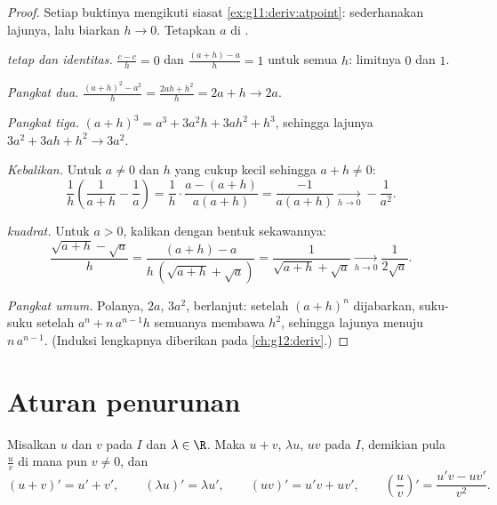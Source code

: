 \begin{proof}
Setiap buktinya mengikuti siasat \cref{ex:g11:deriv:atpoint}: sederhanakan
lajunya, lalu biarkan $h \to 0$. Tetapkan $a$ di .

\emph{ tetap dan  identitas.} $\frac{c - c}{h} = 0$ dan
$\frac{(a+h) - a}{h} = 1$ untuk semua $h$: limitnya $0$ dan $1$.

\emph{Pangkat dua.} $\frac{(a+h)^2 - a^2}{h} = \frac{2ah + h^2}{h} = 2a + h
\to 2a$.

\emph{Pangkat tiga.} $(a+h)^3 = a^3 + 3a^2h + 3ah^2 + h^3$, sehingga lajunya
$3a^2 + 3ah + h^2 \to 3a^2$.

\emph{Kebalikan.} Untuk $a \neq 0$ dan $h$ yang cukup kecil sehingga
$a + h \neq 0$:
\[
\frac{1}{h}\left(\frac{1}{a+h} - \frac{1}{a}\right)
= \frac{1}{h} \cdot \frac{a - (a+h)}{a(a+h)}
= \frac{-1}{a(a+h)}
\xrightarrow[h \to 0]{} -\frac{1}{a^2}.
\]

\emph{ kuadrat.} Untuk $a > 0$, kalikan dengan bentuk sekawannya:
\[
\frac{\sqrt{a+h} - \sqrt a}{h}
= \frac{(a + h) - a}{h\,(\sqrt{a+h} + \sqrt a)}
= \frac{1}{\sqrt{a+h} + \sqrt a}
\xrightarrow[h \to 0]{} \frac{1}{2\sqrt a}.
\]

\emph{Pangkat umum.} Polanya, $2a$, $3a^2$, berlanjut: setelah
$(a+h)^n$ dijabarkan, suku-suku setelah $a^n + n\,a^{n-1}h$ semuanya membawa
$h^2$, sehingga lajunya menuju $n\,a^{n-1}$. (Induksi lengkapnya diberikan pada
\cref{ch:g12:deriv}.)
\end{proof}

\section{Aturan penurunan}

\begin{theorem}[Operasi]\label{thm:g11:deriv:rules}
Misalkan $u$ dan $v$  pada $I$ dan $\lambda \in \R$. Maka
$u + v$, $\lambda u$, $uv$  pada $I$, demikian pula
$\frac{u}{v}$ di mana pun $v \neq 0$, dan
\[
(u+v)' = u' + v', \qquad
(\lambda u)' = \lambda u', \qquad
(uv)' = u'v + uv', \qquad
\left(\frac{u}{v}\right)' = \frac{u'v - uv'}{v^2}.
\]
\end{theorem}

